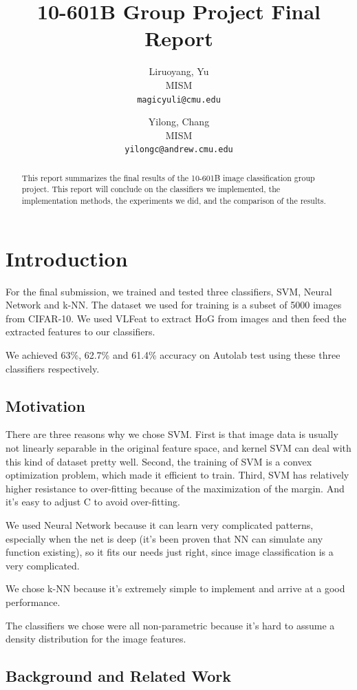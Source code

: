 \documentclass{article} %
\title{10-601B Group Project Final Report}
\author{
Liruoyang, Yu\\
MISM\\
\texttt{magicyuli@cmu.edu}
\and
Yilong, Chang\\
MISM\\
\texttt{yilongc@andrew.cmu.edu}
}
\begin{document}
\maketitle
\begin{abstract}
This report summarizes the final results of the 10-601B image classification group project. This report will conclude on the classifiers we implemented, the implementation methods, the experiments we did, and the comparison of the results.
\end{abstract}

\section{Introduction}
For the final submission, we trained and tested three classifiers, SVM,  Neural Network and k-NN. The dataset we used for training is a subset of 5000 images from CIFAR-10. We used VLFeat to extract HoG from images and then feed the extracted features to our classifiers.

We achieved 63\%, 62.7\% and 61.4\% accuracy on Autolab test using these three classifiers respectively.

\subsection{Motivation}

There are three reasons why we chose SVM. First is that image data is usually not linearly separable in the original feature space, and kernel SVM can deal with this kind of dataset pretty well. Second, the training of SVM is a convex optimization problem, which made it efficient to train. Third, SVM has relatively higher resistance to over-fitting because of the maximization of the margin. And it's easy to adjust C to avoid over-fitting.

We used Neural Network because it can learn very complicated patterns, especially when the net is deep (it's been proven that NN can simulate any function existing), so it fits our needs just right, since image classification is a very complicated.

We chose k-NN because it's extremely simple to implement and arrive at a good performance.

The classifiers we chose were all non-parametric because it's hard to assume a density distribution for the image features.

\subsection{Background and Related Work}
\end{document}
